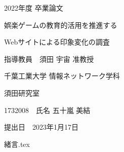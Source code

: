 \documentclass[12pt,a4j,titlepage]{ltjsarticle}
\begin{document}
\begin{titlepage}
  \centering
    \vspace*{40truept}
    {\LARGE 2022年度 卒業論文}
    
    \vspace*{75truept}
    
    {\Huge 娯楽ゲームの教育的活用を推進する}
\vspace*{10truept}

    {\Huge Webサイトによる印象変化の調査}%

    \vspace{85truept}
    
    {\LARGE 指導教員　須田 宇宙 准教授}
    
    \vspace{60truept}
    
    {\LARGE 千葉工業大学 情報ネットワーク学科}
    
    \vspace{15truept}
    
    {\LARGE 須田研究室}
    
    \vspace{70truept}
    
    {\LARGE 1732008　氏名 五十嵐 美結 }　%

    \vspace{70truept}
    
  \begin{flushright}

    \LARGE {提出日　2023年1月17日}
  
  \end{flushright}
\end{titlepage}
\date{}

\tableofcontents
\newpage
\listoftables
\newpage
\listoffigures
\newpage
 {緒言.tex}

\clearpage


\clearpage


\clearpage


\clearpage


\clearpage


\clearpage


\clearpage

\end{document}
